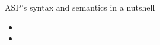 \begin{frame}{ASP's syntax and semantics in a nutshell}
  \begin{itemize}
  \item<1-> 
  \item<2-> 
  \end{itemize}
\end{frame}
%
